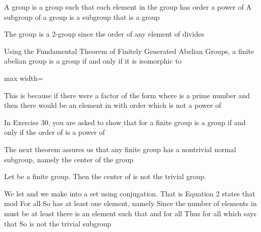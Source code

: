 \documentclass[11pt,oneside]{article}
\begin{document}
\begin{BookBody}
 A group is a group such that each element in the group has order a power of  A subgroup of a group is a subgroup that is a group\BookEnd{\blacksquare}

 The group  is a 2-group since the order of any element of  divides  \BookEnd{\blacktriangle}

 Using the Fundamental Theorem of Finitely Generated Abelian Groups, a finite abelian group is a group if and only if it is isomorphic to

\begin{center}\begin{adjustbox}{max width=\linewidth}\end{adjustbox}\end{center}

\noindent This is because if there were a factor of the form  where  is a prime number and  then there would be an element in  with order  which is not a power of 

In Exercise 30, you are asked to show that for  a finite group is a group if and only if the order of  is a power of 

The next theorem assures us that any finite group has a nontrivial normal subgroup, namely the center of the group\BookEnd{\blacktriangle}

 Let  be a finite group. Then the center of  is not the trivial group.

 We let  and we make  into a set using conjugation. That is Equation 2 states that  mod  For all  So  has at 
least one element, namely  Since the number of elements in  must be at least  there is an element  such that  and  for all  Thus  for all  which says that  So  is not the trivial subgroup\BookEnd{\blacklozenge}

\end{BookBody}
\end{document}
